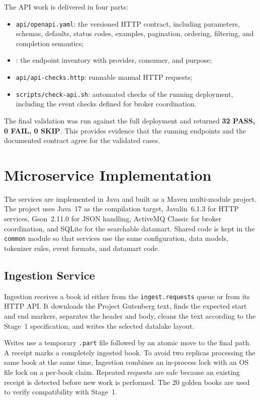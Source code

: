 \documentclass[12pt,a4paper]{article}
\begin{document}
The API work is delivered in four parts:
\begin{itemize}
    \item \texttt{api/openapi.yaml}: the versioned HTTP contract, including parameters, schemas,
    defaults, status codes, examples, pagination, ordering, filtering, and completion semantics;
    \item {}: the endpoint inventory with provider, consumer, and purpose;
    \item \texttt{api/api-checks.http}: runnable manual HTTP requests;
    \item \texttt{scripts/check-api.sh}: automated checks of the running deployment, including the
    event checks defined for broker coordination.
\end{itemize}

The final validation was run against the full deployment and returned \textbf{32 PASS, 0 FAIL, 0
SKIP}. This provides evidence that the running endpoints and the documented contract agree for the
validated cases.


\section{Microservice Implementation}
\label{sec:implementation}
The services are implemented in Java and built as a Maven multi-module project. The project uses
Java~17 as the compilation target, Javalin~6.1.3 for HTTP services, Gson~2.11.0 for JSON handling,
ActiveMQ Classic for broker coordination, and SQLite for the searchable datamart. Shared code is
kept in the \texttt{common} module so that services use the same configuration, data models,
tokenizer rules, event formats, and datamart code.

\subsection{Ingestion Service}

Ingestion receives a book id either from the \texttt{ingest.requests} queue or from its HTTP API.
It downloads the Project Gutenberg text, finds the expected start and end markers, separates the
header and body, cleans the text according to the Stage~1 specification, and writes the selected
datalake layout.

Writes use a temporary \texttt{.part} file followed by an atomic move to the final path. A receipt
marks a completely ingested book. To avoid two replicas processing the same book at the same time,
Ingestion combines an in-process lock with an OS file lock on a per-book claim. Repeated requests
are safe because an existing receipt is detected before new work is performed. The 20 golden books
are used to verify compatibility with Stage~1.
\end{document}
